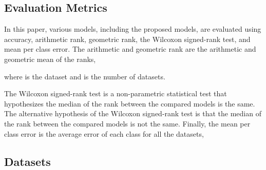 \documentclass[preprint,12pt,3p]{elsarticle}
\begin{document}
 
\subsection{Evaluation Metrics}





In this paper, various models, including the proposed models, are evaluated using accuracy, arithmetic rank, geometric rank, the Wilcoxon signed-rank test, and mean per class error. The arithmetic and geometric rank are the arithmetic and geometric mean of the ranks,


where  is the dataset and  is the number of datasets. 

The Wilcoxon signed-rank test is a non-parametric statistical test that hypothesizes the median of the rank between the compared models is the same. The alternative hypothesis of the Wilcoxon signed-rank test is that the median of the rank between the compared models is not the same. Finally, the mean per class error is the average error of each class for all the datasets,

 
\subsection{Datasets}
\label{dataset_section}


\def\tabularxcolumn#1{m{#1}}
\setlength\arrayrulewidth{1pt}


\newcommand{\heading}[1]{\multicolumn{1}{c}{#1}}
\end{document}
